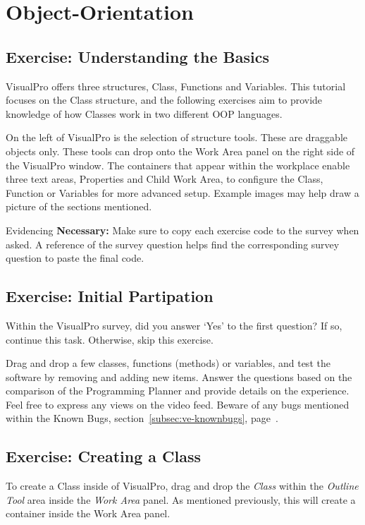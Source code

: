 \documentclass[10pt]{article}
\begin{document}
\section{Object-Orientation}
\label{sec:object-orientation}
    \subsection{Exercise: Understanding the Basics}
        VisualPro offers three structures, Class, Functions and Variables. This tutorial focuses on the Class structure, and the following exercises aim to provide knowledge of how Classes work in two different OOP languages.

        On the left of VisualPro is the selection of structure tools. These are draggable objects only. These tools can drop onto the Work Area panel on the right side of the VisualPro window. The containers that appear within the workplace enable three text areas, Properties and Child Work Area, to configure the Class, Function or Variables for more advanced setup. Example images may help draw a picture of the sections mentioned.

        \begin{tip}{Evidencing}
            \textbf{Necessary:} Make sure to copy each exercise code to the survey when asked. A reference of the survey question helps find the corresponding survey question to paste the final code.
        \end{tip}

    \newpage
    \subsection{Exercise: Initial Partipation}
        Within the VisualPro survey, did you answer `Yes' to the first question? If so, continue this task. Otherwise, skip this exercise.

        Drag and drop a few classes, functions (methods) or variables, and test the software by removing and adding new items. Answer the questions based on the comparison of the Programming Planner and provide details on the experience. Feel free to express any views on the video feed. Beware of any bugs mentioned within the Known Bugs, section~\ref{subsec:ve-knownbugs}, page~\pageref{subsec:ve-knownbugs}.

    \newpage
    \subsection{Exercise: Creating a Class}
        To create a Class inside of VisualPro, drag and drop the \textit{Class} within the \textit{Outline Tool} area inside the \textit{Work Area} panel. As mentioned previously, this will create a container inside the Work Area panel.
\end{document}
